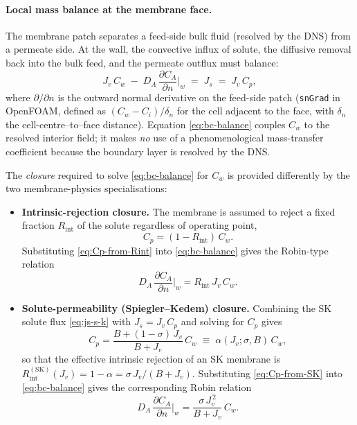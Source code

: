 \documentclass[11pt,a4paper]{article}
\begin{document}
\paragraph{Local mass balance at the membrane face.}
The membrane patch separates a feed-side bulk fluid (resolved by the
DNS) from a permeate side. At the wall, the convective influx of
solute, the diffusive removal back into the bulk feed, and the
permeate outflux must balance:
\begin{equation}
	J_v\,C_w \;-\; D_A\,\frac{\partial C_A}{\partial n}\bigg|_{w}
	\;=\; J_s \;=\; J_v\,C_p ,
	\label{eq:bc-balance}
\end{equation}
where \(\partial/\partial n\) is the outward normal derivative on the
feed-side patch (\texttt{snGrad} in OpenFOAM, defined as
\((C_w - C_i)/\delta_n\) for the cell adjacent to the face, with
\(\delta_n\) the cell-centre--to--face distance). Equation
\eqref{eq:bc-balance} couples \(C_w\) to the resolved interior
field; it makes \emph{no} use of a phenomenological mass-transfer
coefficient because the boundary layer is resolved by the DNS.

The \emph{closure} required to solve \eqref{eq:bc-balance} for
\(C_w\) is provided differently by the two membrane-physics
specialisations:
\begin{itemize}
	\item \textbf{Intrinsic-rejection closure.}
	The membrane is assumed to reject a fixed fraction
	\(R_\mathrm{int}\) of the solute regardless of operating point,
	\begin{equation}
		C_p = (1 - R_\mathrm{int})\,C_w .
		\label{eq:Cp-from-Rint}
	\end{equation}
	Substituting \eqref{eq:Cp-from-Rint} into \eqref{eq:bc-balance}
	gives the Robin-type relation
	\begin{equation}
		D_A\,\frac{\partial C_A}{\partial n}\bigg|_{w}
		= R_\mathrm{int}\,J_v\,C_w .
		\label{eq:Rint-Robin}
	\end{equation}

	\item \textbf{Solute-permeability (Spiegler--Kedem) closure.}
	Combining the SK solute flux \eqref{eq:js-s-k} with
	\(J_s = J_v\,C_p\) and solving for \(C_p\) gives
	\begin{equation}
		C_p = \frac{B + (1-\sigma)\,J_v}{B + J_v}\,C_w
		    \;\equiv\; \alpha(J_v;\sigma,B)\,C_w ,
		\label{eq:Cp-from-SK}
	\end{equation}
	so that the effective intrinsic rejection of an SK membrane is
	\(R_\mathrm{int}^{(\mathrm{SK})}(J_v) = 1 - \alpha = \sigma\,J_v/(B+J_v)\).
	Substituting \eqref{eq:Cp-from-SK} into \eqref{eq:bc-balance}
	gives the corresponding Robin relation
	\begin{equation}
		D_A\,\frac{\partial C_A}{\partial n}\bigg|_{w}
		= \frac{\sigma\,J_v^{\,2}}{B + J_v}\,C_w .
		\label{eq:SK-Robin}
	\end{equation}
\end{itemize}
\end{document}
